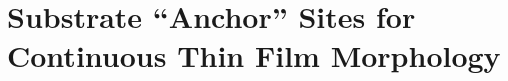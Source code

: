 \section{Substrate ``Anchor'' Sites for Continuous Thin Film Morphology}
\label{Chap:Ag/ZnO:section:anchor}